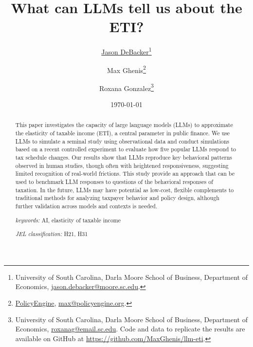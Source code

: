 \documentclass[letterpaper,9pt]{article}
\title{What can LLMs tell us about the ETI?}
\author{
  \href{http://jasondebacker.com/}{Jason DeBacker}\thanks{University of South Carolina, Darla Moore School of Business, Department of Economics, \href{mailto:jason.debacker@moore.sc.edu}{jason.debacker@moore.sc.edu}.}
  \and
  {Max Ghenis}\thanks{\href{https://policyengine.org/}{PolicyEngine}, \href{mailto:max@policyengine.org}{max@policyengine.org}.}
  \and
  {Roxana Gonzalez}\thanks{University of South Carolina, Darla Moore School of Business, Department of Economics, \href{mailto:roxanag@email.sc.edu}{roxanag@email.sc.edu}. Code and data to replicate the results are available on GitHub at \url{https://github.com/MaxGhenis/llm-eti}.}
}
\date{\today}
\theoremstyle{definition}
\begin{document}
\begin{titlepage}
\maketitle
\vspace{-2mm}
\begin{abstract}
\small{This paper investigates the capacity of large language models (LLMs) to approximate the elasticity of taxable income (ETI), a central parameter in public finance. We use LLMs to simulate a seminal study using observational data \citep{GruberSaez2002} and conduct simulations based on a recent controlled experiment \citep{PKNF2024} to evaluate how five popular LLMs respond to tax schedule changes. Our results show that LLMs reproduce key behavioral patterns observed in human studies, though often with heightened responsiveness, suggesting limited recognition of real-world frictions. This study provide an approach that can be used to benchmark LLM responses to questions of the behavioral responses of taxation. In the future, LLMs may have potential as low-cost, flexible complements to traditional methods for analyzing taxpayer behavior and policy design, although further validation across models and contexts is needed.
}

\vspace{10mm}

\noindent\textit{keywords:}\: AI, elasticity of taxable income

\vspace{10mm}

\noindent\textit{JEL classification:} H21, H31 


\end{abstract}
\thispagestyle{empty}
\end{titlepage}
\end{document}
